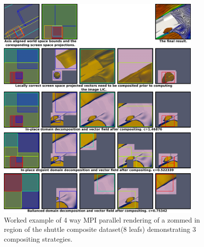 \documentclass[a4paper,10pt]{article}
\begin{document}
\begin{figure}[t!]
 \centering
 \includegraphics[width=0.9\textwidth]{./images-data/compositing-2-200ppi.png}
 \caption{Worked example of 4 way MPI parallel rendering of a zommed in region of the shuttle composite dataset(8 leafs) demonstrating 3 compositing strategies.}
 \label{fig:compositing}
\end{figure}
\end{document}
